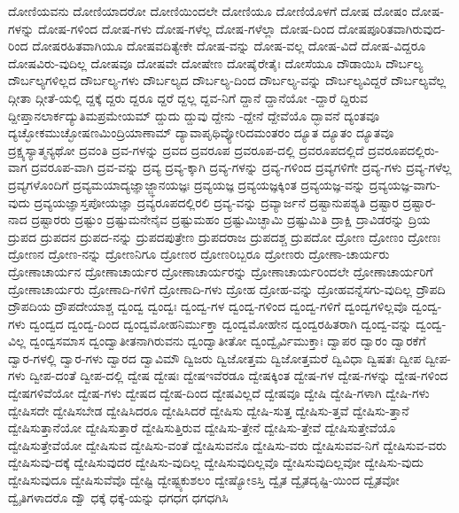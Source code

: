 {ದೋಣಿಯವನು
ದೋಣಿಯಾದರೋ
ದೋಣಿಯಿಂದಲೇ
ದೋಣಿಯೂ
ದೋಣಿಯೊಳಗೆ
ದೋಷ
ದೋಷಂ
ದೋಷ-ಗಳನ್ನು
ದೋಷ-ಗಳಿಂದ
ದೋಷ-ಗಳು
ದೋಷ-ಗಳೆಲ್ಲ
ದೋಷ-ಗಳೆಲ್ಲಾ
ದೋಷ-ದಿಂದ
ದೋಷಪೂರಿತವಾಗಿರುವುದ-ರಿಂದ
ದೋಷರಹಿತವಾಗಿಯೂ
ದೋಷವದಿತ್ಯೇಕೇ
ದೋಷ-ವನ್ನು
ದೋಷ-ವಲ್ಲ
ದೋಷ-ವಿದೆ
ದೋಷ-ವಿದ್ದರೂ
ದೋಷವಿರು-ವುದಿಲ್ಲ
ದೋಷವೂ
ದೋಷವೇ
ದೋಷೇಣ
ದೋಷೈರೇತೈಃ
ದೋಸೆಯೂ
ದೌಡಾಯಿಸಿ
ದೌರ್ಬಲ್ಯ
ದೌರ್ಬಲ್ಯಗಳಿಲ್ಲದ
ದೌರ್ಬಲ್ಯ-ಗಳು
ದೌರ್ಬಲ್ಯದ
ದೌರ್ಬಲ್ಯ-ದಿಂದ
ದೌರ್ಬಲ್ಯ-ವನ್ನು
ದೌರ್ಬಲ್ಯವಿದ್ದರೆ
ದೌರ್ಬಲ್ಯವೆಲ್ಲ
ದ್ಗೀತಾ
ದ್ಗೀತೆ-ಯಲ್ಲಿ
ದ್ದಕ್ಕೆ
ದ್ದರು
ದ್ದರೂ
ದ್ದರೆ
ದ್ದಲ್ಲ
ದ್ದವ-ನಿಗೆ
ದ್ದಾನೆ
ದ್ದಾನೆಯೋ
-ದ್ದಾರೆ
ದ್ದಿರುವ
ದ್ದೀಪ್ತಾನಲಾರ್ಕದ್ಯುತಿಮಪ್ರಮೇಯಮ್
ದ್ದುದು
ದ್ದುವು
ದ್ದೇನು
-ದ್ದೇನೆ
ದ್ದೇವೆಯೊ
ದ್ಭಾವನೆ
ದ್ಯಂತವೂ
ದ್ಯಚ್ಛೋಕಮುಚ್ಛೋಷಣಮಿಂದ್ರಿಯಾಣಾಮ್
ದ್ಯಾವಾಪೃಥಿವ್ಯೋರಿದಮಂತರಂ
ದ್ಯೂತ
ದ್ಯೂತಂ
ದ್ಯೂತವೂ
ದ್ರಕ್ಷ್ಯಸ್ಯಾತ್ಮನ್ಯಥೋ
ದ್ರವಂತಿ
ದ್ರವ-ಗಳನ್ನು
ದ್ರವದ
ದ್ರವರೂಪ
ದ್ರವರೂಪ-ದಲ್ಲಿ
ದ್ರವರೂಪದಲ್ಲಿದೆ
ದ್ರವರೂಪದಲ್ಲಿರು-ವಾಗ
ದ್ರವರೂಪ-ವಾಗಿ
ದ್ರವ-ವನ್ನು
ದ್ರವ್ಯ
ದ್ರವ್ಯ-ಕ್ಕಾಗಿ
ದ್ರವ್ಯ-ಗಳನ್ನು
ದ್ರವ್ಯ-ಗಳಿಂದ
ದ್ರವ್ಯಗಳಿಗೇ
ದ್ರವ್ಯ-ಗಳು
ದ್ರವ್ಯ-ಗಳೆಲ್ಲ
ದ್ರವ್ಯಗಳೊಂದಿಗೆ
ದ್ರವ್ಯಮಯಾದ್ಯಜ್ಞಾಜ್ಜ್ಞಾನಯಜ್ಞಃ
ದ್ರವ್ಯಯಜ್ಞ
ದ್ರವ್ಯಯಜ್ಞಕ್ಕಿಂತ
ದ್ರವ್ಯಯಜ್ಞ-ವನ್ನು
ದ್ರವ್ಯಯಜ್ಞ-ವಾಗು-ವುದು
ದ್ರವ್ಯಯಜ್ಞಾಸ್ತಪೋಯಜ್ಞಾ
ದ್ರವ್ಯರೂಪದಲ್ಲಿರಲಿ
ದ್ರವ್ಯ-ವನ್ನು
ದ್ರವ್ಯಾರ್ಜನೆ
ದ್ರಷ್ಟಾನುಪಶ್ಯತಿ
ದ್ರಷ್ಟಾರ
ದ್ರಷ್ಟಾರ-ನಾದ
ದ್ರಷ್ಟಾರರು
ದ್ರಷ್ಟುಂ
ದ್ರಷ್ಟುಮನೇನೈವ
ದ್ರಷ್ಟುಮಹಂ
ದ್ರಷ್ಟುಮಿಚ್ಛಾಮಿ
ದ್ರಷ್ಟುಮಿತಿ
ದ್ರಾಕ್ಷಿ
ದ್ರಾವಿಡರನ್ನು
ದ್ರಿಯ
ದ್ರುಪದ
ದ್ರುಪದನ
ದ್ರುಪದ-ನನ್ನು
ದ್ರುಪದಪುತ್ರೇಣ
ದ್ರುಪದರಾಜ
ದ್ರುಪದಶ್ಚ
ದ್ರುಪದೋ
ದ್ರೋಣ
ದ್ರೋಣಂ
ದ್ರೋಣಃ
ದ್ರೋಣನ
ದ್ರೋಣ-ನನ್ನು
ದ್ರೋಣನಿಗೂ
ದ್ರೋಣರ
ದ್ರೋಣರಿಬ್ಬರೂ
ದ್ರೋಣರು
ದ್ರೋಣಾ-ಚಾರ್ಯರು
ದ್ರೋಣಾಚಾರ್ಯನ
ದ್ರೋಣಾಚಾರ್ಯರ
ದ್ರೋಣಾಚಾರ್ಯರನ್ನು
ದ್ರೋಣಾಚಾರ್ಯರಿಂದಲೇ
ದ್ರೋಣಾಚಾರ್ಯರಿಗೆ
ದ್ರೋಣಾಚಾರ್ಯರು
ದ್ರೋಣಾದಿ-ಗಳಿಗೆ
ದ್ರೋಣಾದಿ-ಗಳು
ದ್ರೋಹ
ದ್ರೋಹ-ವನ್ನು
ದ್ರೋಹವನ್ನೆಸಗು-ವುದಿಲ್ಲ
ದ್ರೌಪದಿ
ದ್ರೌಪದಿಯ
ದ್ರೌಪದೇಯಾಶ್ಚ
ದ್ವಂದ್ವ
ದ್ವಂದ್ವಃ
ದ್ವಂದ್ವ-ಗಳ
ದ್ವಂದ್ವ-ಗಳಿಂದ
ದ್ವಂದ್ವ-ಗಳಿಗೆ
ದ್ವಂದ್ವಗಳಿಲ್ಲವೊ
ದ್ವಂದ್ವ-ಗಳು
ದ್ವಂದ್ವದ
ದ್ವಂದ್ವ-ದಿಂದ
ದ್ವಂದ್ವಮೋಹನಿರ್ಮುಕ್ತಾ
ದ್ವಂದ್ವಮೋಹೇನ
ದ್ವಂದ್ವರಹಿತರಾಗಿ
ದ್ವಂದ್ವ-ವನ್ನು
ದ್ವಂದ್ವ-ವಿಲ್ಲ
ದ್ವಂದ್ವಸಮಾಸ
ದ್ವಂದ್ವಾತೀತನಾಗಿರುವನು
ದ್ವಂದ್ವಾತೀತೋ
ದ್ವಂದ್ವೈರ್ವಿಮುಕ್ತಾಃ
ದ್ವಾಪರ
ದ್ವಾರಂ
ದ್ವಾರಕೆಗೆ
ದ್ವಾರ-ಗಳಲ್ಲಿ
ದ್ವಾರ-ಗಳು
ದ್ವಾರದ
ದ್ವಾವಿಮೌ
ದ್ವಿಜರು
ದ್ವಿಜೋತ್ತಮ
ದ್ವಿಜೋತ್ತಮರೆ
ದ್ವಿವಿಧಾ
ದ್ವಿಷತಃ
ದ್ವೀಪ
ದ್ವೀಪ-ಗಳು
ದ್ವೀಪ-ದಂತೆ
ದ್ವೀಪ-ದಲ್ಲಿ
ದ್ವೇಷ
ದ್ವೇಷಃ
ದ್ವೇಷಇವೆರಡೂ
ದ್ವೇಷಕ್ಕಿಂತ
ದ್ವೇಷ-ಗಳ
ದ್ವೇಷ-ಗಳನ್ನು
ದ್ವೇಷ-ಗಳಿಂದ
ದ್ವೇಷಗಳಿವೆಯೋ
ದ್ವೇಷ-ಗಳು
ದ್ವೇಷದ
ದ್ವೇಷ-ದಿಂದ
ದ್ವೇಷವಿಲ್ಲದೆ
ದ್ವೇಷವೂ
ದ್ವೇಷಿ
ದ್ವೇಷಿ-ಗಳಾಗಿ
ದ್ವೇಷಿ-ಗಳು
ದ್ವೇಷಿಸದೇ
ದ್ವೇಷಿಸಬೇಡ
ದ್ವೇಷಿಸಿದರೂ
ದ್ವೇಷಿಸಿದರೆ
ದ್ವೇಷಿಸು
ದ್ವೇಷಿ-ಸುತ್ತ
ದ್ವೇಷಿಸು-ತ್ತವೆ
ದ್ವೇಷಿಸು-ತ್ತಾನೆ
ದ್ವೇಷಿಸುತ್ತಾನೆಯೋ
ದ್ವೇಷಿಸುತ್ತಾರೆ
ದ್ವೇಷಿಸುತ್ತಿರುವ
ದ್ವೇಷಿಸು-ತ್ತೇನೆ
ದ್ವೇಷಿಸು-ತ್ತೇವೆ
ದ್ವೇಷಿಸುತ್ತೇವೆಯೊ
ದ್ವೇಷಿಸುತ್ತೇವೆಯೋ
ದ್ವೇಷಿಸುವ
ದ್ವೇಷಿಸು-ವಂತೆ
ದ್ವೇಷಿಸುವನೊ
ದ್ವೇಷಿಸು-ವರು
ದ್ವೇಷಿಸುವವ-ನಿಗೆ
ದ್ವೇಷಿಸುವ-ವರು
ದ್ವೇಷಿಸುವು-ದಕ್ಕೆ
ದ್ವೇಷಿಸುವುದರ
ದ್ವೇಷಿಸು-ವುದಿಲ್ಲ
ದ್ವೇಷಿಸುವುದಿಲ್ಲವೊ
ದ್ವೇಷಿಸುವುದಿಲ್ಲವೋ
ದ್ವೇಷಿಸು-ವುದು
ದ್ವೇಷಿಸುವುದೂ
ದ್ವೇಷಿಸುವೆವೊ
ದ್ವೇಷ್ಟಿ
ದ್ವೇಷ್ಟ್ಯಕುಶಲಂ
ದ್ವೇಷ್ಯೋಽಸ್ತಿ
ದ್ವೈತ
ದ್ವೈತದೃಷ್ಟಿ-ಯಿಂದ
ದ್ವೈತವೋ
ದ್ವೈತಿಗಳಾದರೊ
ದ್ವೌ
ಧಕ್ಕೆ
ಧಕ್ಕೆ-ಯನ್ನು
ಧಗಧಗ
ಧಗಧಗಿಸಿ
}
